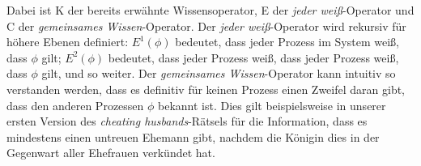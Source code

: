 Dabei ist K der bereits erwähnte Wissensoperator, E der \textit{jeder weiß}-Operator und C der \textit{gemeinsames Wissen}-Operator.
Der \textit{jeder weiß}-Operator wird rekursiv für höhere Ebenen definiert: $E^1(\phi)$ bedeutet, dass jeder Prozess im System weiß, dass $\phi$ gilt; $E^2(\phi)$ bedeutet, dass jeder Prozess weiß, dass jeder Prozess weiß, dass $\phi$ gilt, und so weiter.
Der \textit{gemeinsames Wissen}-Operator kann intuitiv so verstanden werden, dass es definitiv für keinen Prozess einen Zweifel daran gibt, dass den anderen Prozessen $\phi$ bekannt ist. Dies gilt beispielsweise in unserer ersten Version des \textit{cheating husbands}-Rätsels für die Information, dass es mindestens einen untreuen Ehemann gibt, nachdem die Königin dies in der Gegenwart aller Ehefrauen verkündet hat. 